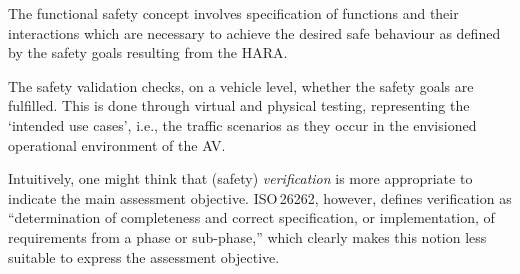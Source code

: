 The functional safety concept \cite[Clause 3.8]{ISO26262} involves specification of functions and their interactions which are necessary to achieve the desired safe behaviour as defined by the safety goals resulting from the HARA. 


The safety validation checks, on a vehicle level, whether the safety goals are fulfilled. This is done through virtual and physical testing, representing the `intended use cases', i.e., the traffic scenarios as they occur in the envisioned operational environment of the AV.

\begin{remark}
	Intuitively, one might think that (safety) \emph{verification} is more appropriate to indicate the main assessment objective. ISO\,26262, however, defines verification as ``determination of completeness and correct specification, or implementation, of requirements from a phase or sub-phase,'' which clearly makes this notion less suitable to express the assessment objective.
\end{remark}

%




